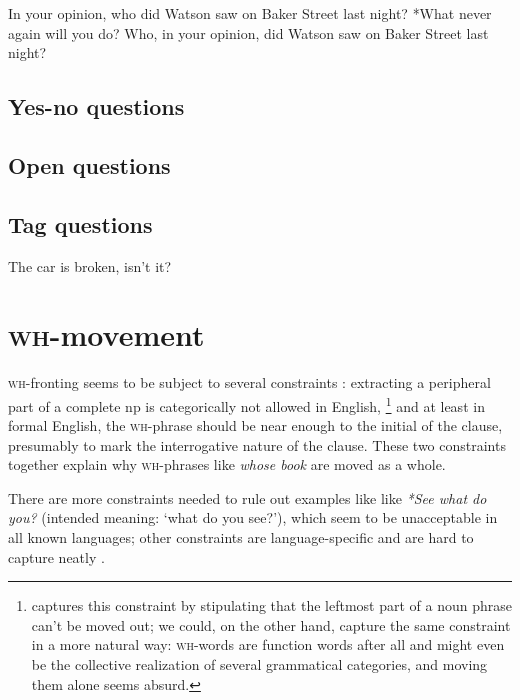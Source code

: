 \documentclass[UTF8, a4paper, oneside, scheme=plain, 12pt]{ctexbook}
\newcommand{\form}[1]{\emph{#1}}
\newcommand{\category}[1]{\textsc{#1}}
\newcommand{\translate}[1]{`#1'}
\begin{document}
\begin{exe}
    \ex\label{ex:clause.interrogative.fronting.1} In your opinion, who did Watson saw on Baker Street last night?
    \ex\label{ex:clause.interrogative.no-focusing.1} *What never again will you do?
    \ex\label{ex:clause.interrogative.fronting.2} Who, in your opinion, did Watson saw on Baker Street last night?  
\end{exe}

\subsection{Yes-no questions}

\subsection{Open questions}

\subsection{Tag questions}

\begin{exe}
    \ex The car is broken, isn't it?
\end{exe}

\section{\category{wh}-movement}

\category{wh}-fronting seems to be subject to several constraints \citep{cable2012pied}:
extracting a peripheral part of a complete \acs{np} is categorically not allowed in English,%
\footnote{
    \citet{cable2012pied} captures this constraint 
    by stipulating that the leftmost part of a noun phrase can't be moved out; 
    we could, on the other hand, capture the same constraint in a more natural way:
    \category{wh}-words are function words after all
    and might even be the collective realization of several grammatical categories, 
    and moving them alone seems absurd.
} 
and at least in formal English, the \category{wh}-phrase 
should be near enough to the initial of the clause, 
presumably to mark the interrogative nature of the clause.
These two constraints together explain why \category{wh}-phrases 
like \form{whose book} are moved as a whole.

There are more constraints needed to rule out examples like
like \form{*See what do you?} (intended meaning: \translate{what do you see?}),
which seem to be unacceptable in all known languages;
other constraints are language-specific and are hard to capture neatly \citep{cable2013pied}.
\end{document}
